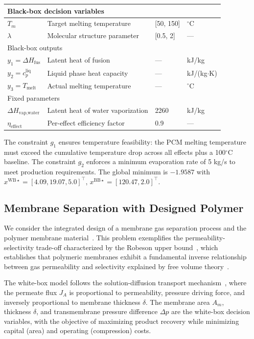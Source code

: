 \documentclass[12pt,a4paper]{article}%
\theoremstyle{plain}%
\theoremstyle{remark}%
\theoremstyle{definition}%
\def\WB{\mathrm{WB}}
\def\BB{\mathrm{BB}}
\providecommand{\DIFaddtex}[1]{{\protect\color{blue}\uwave{#1}}} %
\providecommand{\DIFaddbegin}{} %
\providecommand{\DIFaddend}{} %
\providecommand{\DIFadd}[1]{\texorpdfstring{\DIFaddtex{#1}}{#1}} %
\newcommand{\DIFaddincludegraphics}[2][]{{\color{blue}\fbox{\DIFOincludegraphics[#1]{#2}}}} %
\DeclareRobustCommand{\DIFaddbegin}{\DIFOaddbegin \let\includegraphics\DIFaddincludegraphics} %
\DeclareRobustCommand{\DIFaddend}{\DIFOaddend \let\includegraphics\DIFOincludegraphics} %
\begin{document}
\begin{appendices}
\begin{table}[htbp]
\begin{tabular}{@{}llll@{}}
\midrule
\multicolumn{4}{l}{Black-box decision variables} \\
\midrule
$T_m$ & Target melting temperature & [50, 150] & $^\circ$C \\
$\lambda$ & Molecular structure parameter & [0.5, 2] & --- \\
\midrule
\multicolumn{4}{l}{Black-box outputs} \\
\midrule
$y_1 = \Delta H_{\text{fus}}$ & Latent heat of fusion & --- & kJ/kg \\
$y_2 = c_p^{\text{liq}}$ & Liquid phase heat capacity & --- & kJ/(kg$\cdot$K) \\
$y_3 = T_{\text{melt}}$ & Actual melting temperature & --- & $^\circ$C \\
\midrule
\multicolumn{4}{l}{Fixed parameters} \\
\midrule
$\Delta H_{\text{vap,water}}$ & Latent heat of water vaporization & 2260 & kJ/kg \\
$\eta_{\text{effect}}$ & Per-effect efficiency factor & 0.9 & --- \\
\bottomrule
\end{tabular}
\end{table}

The constraint $g_1$ ensures temperature feasibility: the PCM melting temperature must exceed the cumulative temperature drop across all effects plus a 100$^\circ$C baseline. The constraint $g_2$ enforces a minimum evaporation rate of 5 kg/s to meet production requirements. The global minimum \DIFaddbegin \DIFadd{for parameters in Table~\ref{tab:evaporator_vars} }\DIFaddend is $-1.9587$ with $x^{\WB\star} = [4.09, 19.07, 5.0]^\top$, $x^{\BB\star} = [120.47, 2.0]^\top$.

\subsection{Membrane Separation with Designed Polymer}\label{subsec:app_membrane}

We consider the integrated design of a membrane gas separation process and the polymer membrane material~\cite{qi2000membrane}. This problem exemplifies the permeability-selectivity trade-off characterized by the Robeson upper bound~\cite{robeson1991correlation,robeson2008upper}, which establishes that polymeric membranes exhibit a fundamental inverse relationship between gas permeability and selectivity explained by free volume theory~\cite{freeman1999basis}.

The white-box model follows the solution-diffusion transport mechanism~\cite{wijmans1995solution}, where the permeate flux $J_A$ is proportional to permeability, pressure driving force, and inversely proportional to membrane thickness $\delta$. The membrane area $A_m$, thickness $\delta$, and transmembrane pressure difference $\Delta p$ are the white-box decision variables, with the objective of maximizing product recovery while minimizing capital (area) and operating (compression) costs.


\end{appendices}
\end{document}

